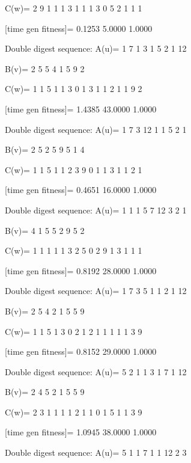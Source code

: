 C(w)=
     2     9     1     1     1     3     1     1     1     3     0     5     2     1     1     1

[time gen fitness]=
    0.1253    5.0000    1.0000

Double digest sequence:
A(u)=
     1     7     1     3     1     5     2     1    12

B(v)=
     2     5     5     4     1     5     9     2

C(w)=
     1     1     5     1     1     3     0     1     3     1     1     2     1     1     9     2

[time gen fitness]=
    1.4385   43.0000    1.0000

Double digest sequence:
A(u)=
     1     7     3    12     1     1     5     2     1

B(v)=
     2     5     2     5     9     5     1     4

C(w)=
     1     1     5     1     1     2     3     9     0     1     1     3     1     1     2     1

[time gen fitness]=
    0.4651   16.0000    1.0000

Double digest sequence:
A(u)=
     1     1     1     5     7    12     3     2     1

B(v)=
     4     1     5     5     2     9     5     2

C(w)=
     1     1     1     1     1     3     2     5     0     2     9     1     3     1     1     1

[time gen fitness]=
    0.8192   28.0000    1.0000

Double digest sequence:
A(u)=
     1     7     3     5     1     1     2     1    12

B(v)=
     2     5     4     2     1     5     5     9

C(w)=
     1     1     5     1     3     0     2     1     2     1     1     1     1     1     3     9

[time gen fitness]=
    0.8152   29.0000    1.0000

Double digest sequence:
A(u)=
     5     2     1     1     3     1     7     1    12

B(v)=
     2     4     5     2     1     5     5     9

C(w)=
     2     3     1     1     1     1     2     1     1     0     1     5     1     1     3     9

[time gen fitness]=
    1.0945   38.0000    1.0000

Double digest sequence:
A(u)=
     5     1     1     7     1     1    12     2     3

